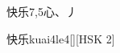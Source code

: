 \begin{entry}{快乐}{7,5}{⼼、⼃}
  \begin{phonetics}{快乐}{kuai4le4}[][HSK 2]
  \end{phonetics}
\end{entry}
